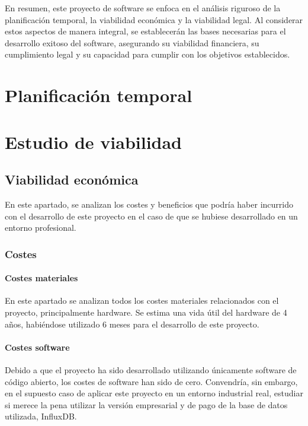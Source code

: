 En resumen, este proyecto de software se enfoca en el análisis riguroso de la planificación 
temporal, la viabilidad económica y la viabilidad legal. Al considerar estos aspectos de 
manera integral, se establecerán las bases necesarias para el desarrollo exitoso del software, 
asegurando su viabilidad financiera, su cumplimiento legal y su capacidad para cumplir con los 
objetivos establecidos.

\section{Planificación temporal}


\section{Estudio de viabilidad}

\subsection{Viabilidad económica}

En este apartado, se analizan los costes y beneficios que podría haber incurrido con el desarrollo 
de este proyecto en el caso de que se hubiese desarrollado en un entorno profesional.

\subsubsection*{Costes}

\paragraph*{Costes materiales}
En este apartado se analizan todos los costes materiales relacionados con el proyecto, principalmente 
hardware. Se estima una vida útil del hardware de 4 años, habiéndose utilizado 6 meses para 
el desarrollo de este proyecto.


\paragraph*{Costes software}
Debido a que el proyecto ha sido desarrollado utilizando únicamente software de código abierto,
los costes de software han sido de cero. Convendría, sin embargo, en el supuesto caso de aplicar
este proyecto en un entorno industrial real, estudiar si merece la pena utilizar la versión empresarial 
y de pago de la base de datos utilizada, InfluxDB.

